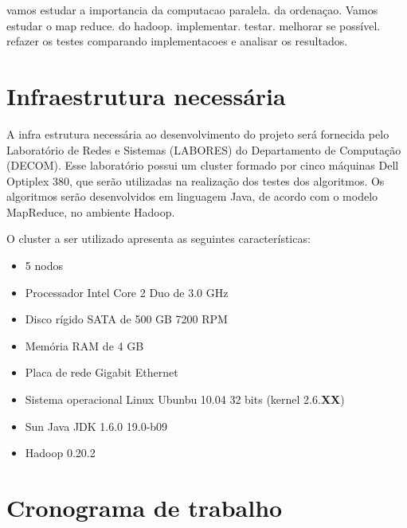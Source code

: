 vamos estudar a importancia da computacao paralela. da ordenaçao.
Vamos estudar o map reduce. do hadoop.
implementar. testar. melhorar se possível. refazer os testes comparando implementacoes e analisar os resultados. 

\section{Infraestrutura necessária}

A infra estrutura necessária ao desenvolvimento do projeto será fornecida pelo Laboratório de Redes e Sistemas (LABORES) do Departamento de Computação (DECOM). Esse laboratório possui um cluster formado por cinco máquinas Dell Optiplex 380, que serão utilizadas na realização dos testes dos algoritmos. Os algoritmos serão desenvolvidos em linguagem Java, de acordo com o modelo MapReduce, no ambiente Hadoop. 

O cluster a ser utilizado apresenta as seguintes características:
\begin{itemize}
\item 5 nodos
\item Processador Intel Core 2 Duo de 3.0 GHz
\item Disco rígido SATA de 500 GB 7200 RPM
\item Memória RAM de 4 GB
\item Placa de rede Gigabit Ethernet
\item Sistema operacional Linux Ubunbu 10.04 32 bits (kernel 2.6.\textbf{XX})
\item Sun Java JDK 1.6.0 19.0-b09 
\item Hadoop 0.20.2
\end{itemize}

\section{Cronograma de trabalho}

